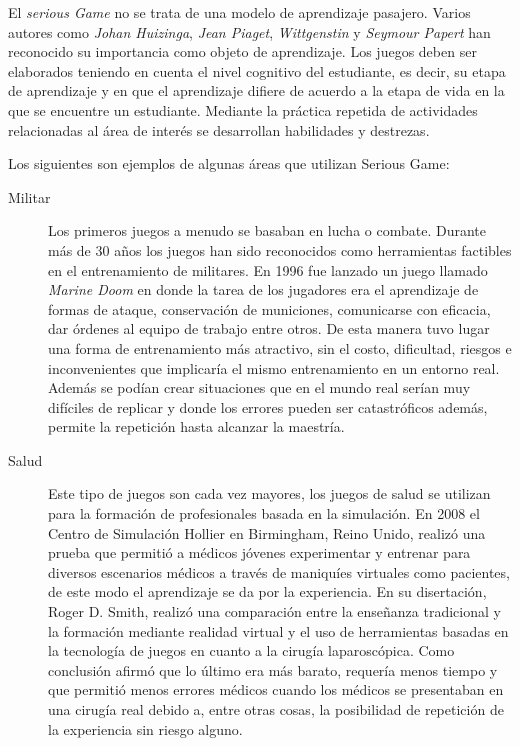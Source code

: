 El \emph{serious Game} no se trata de una modelo de aprendizaje pasajero. Varios
autores como \emph{Johan Huizinga}, \emph{Jean Piaget}, \emph{Wittgenstin} y
\emph{Seymour Papert} han reconocido su importancia  como objeto de aprendizaje.
Los juegos deben ser elaborados teniendo en cuenta el nivel cognitivo del
estudiante, es decir, su etapa de aprendizaje y en que el aprendizaje difiere de
acuerdo a la etapa de vida en la que se encuentre un estudiante. Mediante la
práctica repetida de actividades relacionadas al área de interés se desarrollan
habilidades y destrezas\cite{education:games}. 


Los siguientes son ejemplos de algunas áreas que utilizan Serious Game:

\begin{description}

\item[Militar] Los primeros juegos a menudo se basaban en lucha o combate.
	Durante más de 30 años los juegos han sido reconocidos como herramientas
	factibles en el entrenamiento de militares. En 1996 fue lanzado un juego
	llamado \emph{Marine Doom} en donde la tarea de los jugadores era el
	aprendizaje de formas de ataque, conservación de municiones, comunicarse
	con eficacia, dar órdenes al equipo de trabajo entre otros. De esta
	manera tuvo lugar una forma de entrenamiento más atractivo, sin el
	costo, dificultad, riesgos e inconvenientes que implicaría el mismo
	entrenamiento en un entorno real. Además se podían crear situaciones que
	en el mundo real serían muy difíciles de replicar y donde los errores
	pueden ser catastróficos además, permite la repetición hasta alcanzar la
	maestría\cite{education:games}.


\item[Salud] Este tipo de juegos son cada vez mayores, los juegos de salud se
	utilizan para la formación de profesionales basada en la simulación. En
	2008 el Centro de Simulación Hollier en Birmingham, Reino Unido, realizó
	una prueba que permitió a médicos jóvenes experimentar y entrenar para
	diversos escenarios médicos a través de maniquíes virtuales como
	pacientes, de este modo el aprendizaje se da por la experiencia. En su
	disertación, Roger D. Smith, realizó una comparación entre la enseñanza
	tradicional y la formación mediante realidad virtual y el uso de
	herramientas basadas en la tecnología de juegos en cuanto a la cirugía
	laparoscópica. Como conclusión afirmó que lo último era más barato,
	requería menos tiempo y que permitió menos errores médicos cuando los
	médicos se presentaban en una cirugía real debido a, entre otras cosas,
	la posibilidad de repetición de la experiencia sin riesgo
	alguno\cite{education:games}.




\end{description}
